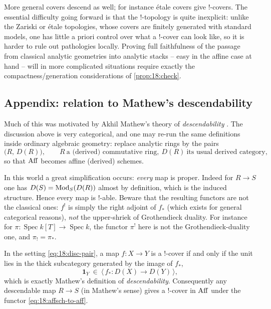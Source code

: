 \begin{remark}
\label{rmk:18:inexplicit}
More general covers descend as well; for instance \'etale covers give $!$-covers.
The essential difficulty going forward is that the $!$-topology is quite
inexplicit: unlike the Zariski or \'etale topologies, whose covers are finitely
generated with standard models, one has little a priori control over what a
$!$-cover can look like, so it is harder to rule out pathologies locally. Proving
full faithfulness of the passage from classical analytic geometries into analytic
stacks -- easy in the affine case at hand -- will in more complicated situations
require exactly the compactness/generation considerations of
\cref{prop:18:check}.
\end{remark}

\subsection{Appendix: relation to Mathew's descendability}
\label{subsec:18:descendability}

Much of this was motivated by Akhil Mathew's theory of \emph{descendability}
\cite{mathew2016galoisgroupstablehomotopy}. The discussion above is very
categorical, and one may re-run the same definitions inside ordinary algebraic
geometry: replace analytic rings by the pairs
\begin{equation}
\label{eq:18:disc-pair}
\bigl(R,\,D(R)\bigr),\qquad R\ \text{a (derived) commutative ring},\ D(R)\ \text{its usual derived category},
\end{equation}
so that $\operatorname{Aff}$ becomes affine (derived) schemes.

\begin{remark}
\label{rmk:18:everything-proper}
In this world a great simplification occurs: \emph{every} map is proper. Indeed for
$R\to S$ one has $D(S)=\operatorname{Mod}_S(D(R))$ almost by definition, which is the induced
structure. Hence every map is $!$-able. Beware that the resulting functors are not
the classical ones: $f^!$ is simply the right adjoint of $f_*$ (which exists for
general categorical reasons), \emph{not} the upper-shriek of Grothendieck duality.
For instance for $\pi\colon\operatorname{Spec}k[T]\to\operatorname{Spec}k$, the
functor $\pi^!$ here is not the Grothendieck-duality one, and $\pi_!=\pi_*$.
\end{remark}

\begin{proposition}[$!$-covers $=$ descendable maps]
\label{prop:18:descendable}
In the setting \eqref{eq:18:disc-pair}, a map $f\colon X\to Y$ is a $!$-cover if and
only if the unit lies in the thick subcategory generated by the image of $f_*$,
\begin{equation}
\label{eq:18:descendable}
\mathbf 1_Y\ \in\ \bigl\langle\, f_*\colon D(X)\to D(Y)\,\bigr\rangle,
\end{equation}
which is exactly Mathew's definition of \emph{descendability}. Consequently any
descendable map $R\to S$ (in Mathew's sense) gives a $!$-cover in $\operatorname{Aff}$ under the
functor \eqref{eq:18:affsch-to-aff}.
\end{proposition}

